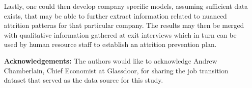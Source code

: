 \documentclass[10pt]{article}
\begin{document}
Lastly, one could then develop company specific models, 
assuming sufficient data exists, that may be able to further extract information 
related to nuanced attrition patterns for that particular company.  The results 
may then be merged with qualitative information gathered at exit interviews which  
in turn can be used by human resource staff to establish an attrition prevention plan. 

\textbf{Acknowledgements:} The authors would like to acknowledge Andrew Chamberlain, 
Chief Economist at Glassdoor, for sharing the job transition dataset that served 
as the data source for this study. 




\end{document}
